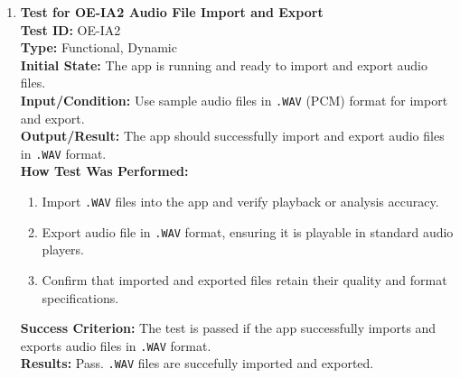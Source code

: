 \documentclass[12pt, titlepage]{article}
\begin{document}
\begin{enumerate}
    \item \textbf{Test for OE-IA2 Audio File Import and Export} \\
      \newline
      \textbf{Test ID:} OE-IA2 \\
      \textbf{Type:} Functional, Dynamic \\
      \textbf{Initial State:} The app is running and ready to import and export audio files. \\
      \textbf{Input/Condition:} Use sample audio files in \texttt{.WAV} (PCM) format for import and export. \\
      \textbf{Output/Result:} The app should successfully import and export audio files in \texttt{.WAV} format. \\
      \textbf{How Test Was Performed:}
      \begin{enumerate}
          \item Import \texttt{.WAV} files into the app and verify playback or analysis accuracy.
          \item Export audio file in \texttt{.WAV} format, ensuring it is playable in standard audio players.
          \item Confirm that imported and exported files retain their quality and format specifications.
      \end{enumerate}
      \textbf{Success Criterion:} The test is passed if the app successfully imports and exports audio files in \texttt{.WAV} format.\\
      \textbf{Results:} Pass. \texttt{.WAV} files are succefully imported and exported. \\


\end{enumerate}
\end{document}
